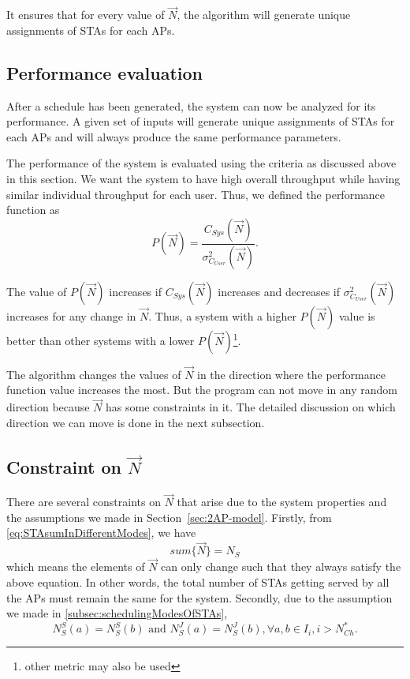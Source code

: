 It ensures that for every value of $\vec{N}$, the algorithm will generate unique assignments of STAs for each APs.



\subsection{Performance evaluation}
After a schedule has been generated, the system can now be analyzed for its performance. A given set of inputs will generate unique assignments of STAs for each APs and will always produce the same performance parameters.

The performance of the system is evaluated using the criteria as discussed above in this section.
We want the system to have high overall throughput while having similar individual throughput for each user. Thus, we defined the performance function as
\begin{equation}
    P(\vec{N}) = \frac{C_{Sys}(\vec{N})}{\sigma_{C_{User}}^2(\vec{N})}.
\end{equation}

The value of $P(\vec{N})$ increases if $C_{Sys}(\vec{N})$ increases and decreases if $\sigma_{C_{User}}^2(\vec{N})$ increases for any change in $\vec{N}$.
Thus, a system with a higher $P(\vec{N})$ value is better than other systems with a lower $P(\vec{N})$\footnote{other metric may also be used}.

The algorithm changes the values of $\vec{N}$ in the direction where the performance function value increases the most. But the program can not move in any random direction because $\vec{N}$ has some constraints in it. The detailed discussion on which direction we can move is done in the next subsection.



\subsection{Constraint on $\Vec{N}$}
There are several constraints on $\Vec{N}$ that arise due to the system properties and the assumptions we made in Section~\ref{sec:2AP-model}.
Firstly, from \eqref{eq:STAsumInDifferentModes}, we have
\begin{equation}
    sum \{\vec{N}\} = N_S
\end{equation}
which means the elements of $\vec{N}$ can only change such that they always satisfy the above equation.
In other words, the total number of STAs getting served by all the APs must remain the same for the system.
Secondly, due to the assumption we made in \ref{subsec:schedulingModesOfSTAs},
\begin{equation}
    N_S^S(a) = N_S^S(b) \text{ and } N_S^J(a) = N_S^J(b), \forall a, b \in I_i, i > N_{Ch}^*.
\end{equation}



